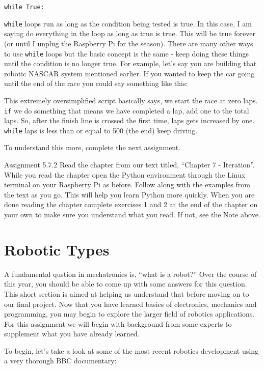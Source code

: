 \documentclass[
]{book}
\begin{document}
\texttt{while\ True:}

\texttt{while} loops run as long as the condition being tested is true. In this case, I am saying do everything in the loop as long as true is true. This will be true forever (or until I unplug the Raspberry Pi for the season). There are many other ways to use \texttt{while} loops but the basic concept is the same - keep doing these things until the condition is no longer true. For example, let's say you are building that robotic NASCAR system mentioned earlier. If you wanted to keep the car going until the end of the race you could say something like this:

This extremely oversimplified script basically says, we start the race at zero laps. \texttt{if} we do something that means we have completed a lap, add one to the total laps. So, after the finish line is crossed the first time, laps gets increased by one. \texttt{while} laps is less than or equal to 500 (the end) keep driving.

To understand this more, complete the next assignment.

Assignment 5.7.2
Read the chapter from our text titled, ``Chapter 7 - Iteration''. While you read the chapter open the Python environment through the Linux terminal on your Raspberry Pi as before. Follow along with the examples from the text as you go. This will help you learn Python more quickly. When you are done reading the chapter complete exercises 1 and 2 at the end of the chapter on your own to make sure you understand what you read. If not, see the Note above.

\hypertarget{robotic-types}{%
\chapter{Robotic Types}\label{robotic-types}}

A fundamental qustion in mechatronics is, ``what is a robot?'' Over the course of this year, you should be able to come up with some answers for this question. This short section is aimed at helping us understand that before moving on to our final project. Now that you have learned basics of electronics, mechanics and programming, you may begin to explore the larger field of robotics applications. For this assignment we will begin with background from some experts to supplement what you have already learned.

To begin, let's take a look at some of the most recent robotics development using a very thorough BBC documentary:
\end{document}
